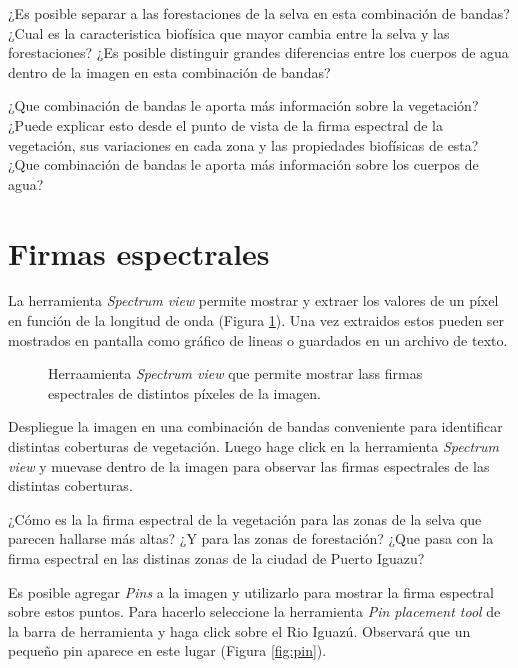\documentclass[a4paper,12pt]{book}
\begin{document}
\begin{que}
    ¿Es posible separar a las forestaciones de la selva en esta combinación de bandas? ¿Cual es la caracteristica biofísica que mayor cambia entre la selva y las forestaciones? ¿Es posible distinguir grandes diferencias entre los cuerpos de agua dentro de la imagen en esta combinación de bandas?
\end{que}

\begin{que}
    ¿Que combinación de bandas le aporta más información sobre la vegetación? ¿Puede explicar esto desde el punto de vista de la firma espectral de la vegetación, sus variaciones en cada zona y las propiedades biofísicas de esta? ¿Que combinación de bandas le aporta más información sobre los cuerpos de agua?
\end{que}

\section{Firmas espectrales}

La herramienta \emph{Spectrum view} permite mostrar y extraer los valores de un píxel en función de la longitud de onda (Figura \ref{fig:sps}). Una vez extraidos estos pueden ser mostrados en pantalla como gráfico de lineas o guardados en un archivo de texto.

\begin{figure}
    \caption{Herraamienta \emph{Spectrum view} que permite mostrar lass firmas espectrales de distintos píxeles de la imagen.}
    \label{fig:sps}
\end{figure}

Despliegue la imagen  en una combinación de bandas conveniente para identificar distintas coberturas de vegetación. Luego hage click en la herramienta \emph{Spectrum view} y muevase dentro de la imagen para observar las firmas espectrales de las distintas coberturas.

\begin{que}
    ¿Cómo es la la firma espectral de la vegetación para las zonas de la selva que parecen hallarse más altas? ¿Y para las zonas de forestación? ¿Que pasa con la firma espectral en las distinas zonas de la ciudad de Puerto Iguazu?
\end{que}

Es posible agregar \emph{Pins} a la imagen y utilizarlo para mostrar la firma espectral sobre estos puntos. Para hacerlo seleccione la herramienta \emph{Pin placement tool} de la barra de herramienta y haga click sobre el Rio Iguazú. Observará que un pequeño pin aparece en este lugar (Figura \ref{fig:pin}).
\end{document}
